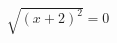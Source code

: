 \documentclass[preview]{standalone}
\begin{document}
\begin{align*}
\sqrt{(x + 2)^2} = 0
\end{align*}
\end{document}
